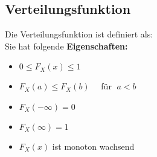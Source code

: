 		\subsection{Verteilungsfunktion}
			Die Verteilungsfunktion ist definiert als:$\qquad$\\[0.2cm]
			Sie hat folgende \textbf{Eigenschaften:}\\
			\begin{minipage}{0.5\textwidth}
				\begin{itemize}
					\item $0\leq F_X(x)\leq 1$\\[-0.35cm]
					\item $F_X(a)\leq F_X(b)\quad$ für $\; a < b$\\[-0.35cm]
				\end{itemize}
			\end{minipage}
			\begin{minipage}{0.5\textwidth}
				\begin{itemize}
					\item $F_X(-\infty) = 0$\\[-0.35cm]
					\item $F_X(\infty) = 1$\\[-0.35cm]
					\item $F_X(x)$ ist monoton wachsend
				\end{itemize}
			\end{minipage}				

